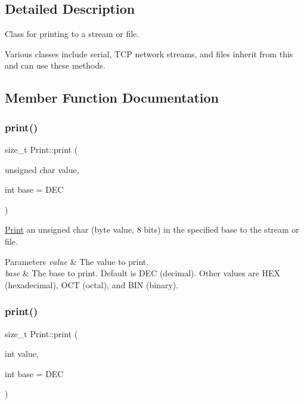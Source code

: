 \subsection{Detailed Description}
Class for printing to a stream or file. 

Various classes include serial, T\+CP network streams, and files inherit from this and can use these methods. 

\subsection{Member Function Documentation}
\mbox{\label{class_print_ae35481e77567618140cd58d8b96d3747}} 
\subsubsection{\texorpdfstring{print()}{print()}\hspace{0.1cm}{\footnotesize\ttfamily [1/6]}}
{\footnotesize\ttfamily size\+\_\+t Print\+::print (\begin{DoxyParamCaption}\item[{unsigned char}]{value,  }\item[{int}]{base = {\ttfamily DEC} }\end{DoxyParamCaption})}



\mbox{\hyperlink{class_print}{Print}} an unsigned char (byte value, 8 bits) in the specified base to the stream or file. 


\begin{DoxyParams}{Parameters}
{\em value} & The value to print. \\
\hline
{\em base} & The base to print. Default is D\+EC (decimal). Other values are H\+EX (hexadecimal), O\+CT (octal), and B\+IN (binary). \\
\hline
\end{DoxyParams}
\mbox{\label{class_print_aa28ddbde83b14df73b41c919ecc4478f}} 
\subsubsection{\texorpdfstring{print()}{print()}\hspace{0.1cm}{\footnotesize\ttfamily [2/6]}}
{\footnotesize\ttfamily size\+\_\+t Print\+::print (\begin{DoxyParamCaption}\item[{int}]{value,  }\item[{int}]{base = {\ttfamily DEC} }\end{DoxyParamCaption})}



